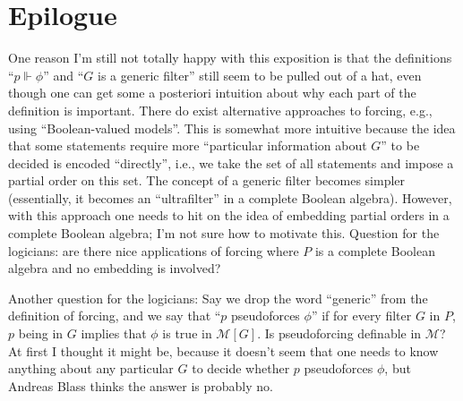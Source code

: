 \documentclass[10pt]{article}
\begin{document}
\section{Epilogue}

One reason I'm still not totally happy with this exposition is that the definitions ``$p \Vdash \phi$'' and ``$G$ is a generic filter'' still seem to be pulled out of a hat, even though one can get some a posteriori intuition about why each part of the definition is important. There do exist alternative approaches to forcing, e.g., using ``Boolean-valued models''. This is somewhat more intuitive because the idea that some statements require more ``particular information about $G$'' to be decided is encoded ``directly'',
i.e., we take the set of all statements and impose a partial order on this
set. The concept of a generic filter becomes simpler (essentially, it becomes an ``ultrafilter'' in a complete Boolean algebra). However, with this approach one needs to hit on the idea of embedding partial orders in a complete Boolean algebra; I'm not sure how to motivate this. Question for the logicians: are there nice applications of forcing where $P$ is a complete Boolean algebra and no embedding is involved?

Another question for the logicians: Say we drop the word ``generic'' from the definition of forcing, and we say that ``$p$ pseudoforces $\phi$'' if for every filter $G$ in $P$, $p$ being in $G$ implies that $\phi$ is true in $\mathcal{M}[G]$. Is pseudoforcing definable in $\mathcal{M}$? At first I thought it might be, because it doesn't seem that one needs to know anything about any particular $G$ to decide whether $p$ pseudoforces $\phi$, but Andreas Blass thinks the answer is probably no.
\end{document}
